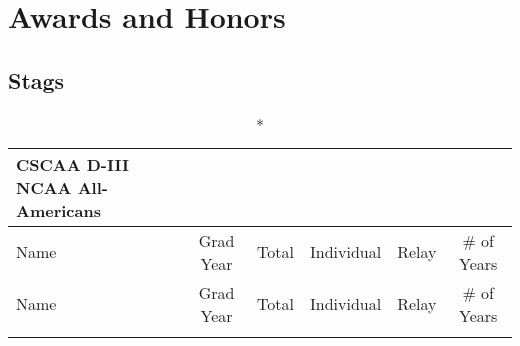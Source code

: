 \section{Awards and Honors }

\subsection{Stags}

\begin{longtable}{lccccc}
\caption*{CSCAA D-III NCAA All-Americans} \\
\toprule
Name & Grad Year & Total & Individual & Relay & \# of Years \\
\midrule
\endfirsthead

\toprule
Name & Grad Year & Total & Individual & Relay & \# of Years \\
\midrule
\endhead

\bottomrule
\endfoot


\end{longtable}
